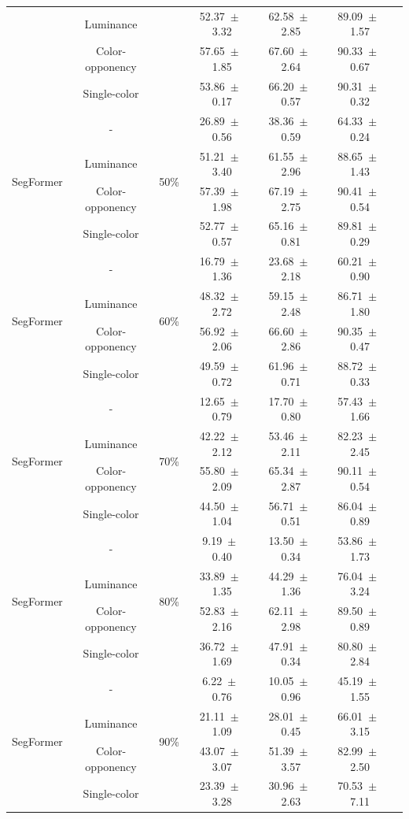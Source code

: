 \begin{table}[h]
\begin{tabular}{@{}lccc ccc@{}}
& Luminance & & 52.37~$\pm$~3.32 & 62.58~$\pm$~2.85 & 89.09~$\pm$~1.57 \\
& Color-opponency & & 57.65~$\pm$~1.85 & 67.60~$\pm$~2.64 & 90.33~$\pm$~0.67 \\
& Single-color & & 53.86~$\pm$~0.17 & 66.20~$\pm$~0.57 & 90.31~$\pm$~0.32 \\
\midrule
\multirow{4}{*}{SegFormer} & - & \multirow{4}{*}{50\%} & 26.89~$\pm$~0.56 & 38.36~$\pm$~0.59 & 64.33~$\pm$~0.24 \\
& Luminance & & 51.21~$\pm$~3.40 & 61.55~$\pm$~2.96 & 88.65~$\pm$~1.43 \\
& Color-opponency & & 57.39~$\pm$~1.98 & 67.19~$\pm$~2.75 & 90.41~$\pm$~0.54 \\
& Single-color & & 52.77~$\pm$~0.57 & 65.16~$\pm$~0.81 & 89.81~$\pm$~0.29 \\
\midrule
\multirow{4}{*}{SegFormer} & - & \multirow{4}{*}{60\%} & 16.79~$\pm$~1.36 & 23.68~$\pm$~2.18 & 60.21~$\pm$~0.90 \\
& Luminance & & 48.32~$\pm$~2.72 & 59.15~$\pm$~2.48 & 86.71~$\pm$~1.80 \\
& Color-opponency & & 56.92~$\pm$~2.06 & 66.60~$\pm$~2.86 & 90.35~$\pm$~0.47 \\
& Single-color & & 49.59~$\pm$~0.72 & 61.96~$\pm$~0.71 & 88.72~$\pm$~0.33 \\
\midrule
\multirow{4}{*}{SegFormer} & - & \multirow{4}{*}{70\%} & 12.65~$\pm$~0.79 & 17.70~$\pm$~0.80 & 57.43~$\pm$~1.66 \\
& Luminance & & 42.22~$\pm$~2.12 & 53.46~$\pm$~2.11 & 82.23~$\pm$~2.45 \\
& Color-opponency & & 55.80~$\pm$~2.09 & 65.34~$\pm$~2.87 & 90.11~$\pm$~0.54 \\
& Single-color & & 44.50~$\pm$~1.04 & 56.71~$\pm$~0.51 & 86.04~$\pm$~0.89 \\
\midrule
\multirow{4}{*}{SegFormer} & - & \multirow{4}{*}{80\%} & 9.19~$\pm$~0.40 & 13.50~$\pm$~0.34 & 53.86~$\pm$~1.73 \\
& Luminance & & 33.89~$\pm$~1.35 & 44.29~$\pm$~1.36 & 76.04~$\pm$~3.24 \\
& Color-opponency & & 52.83~$\pm$~2.16 & 62.11~$\pm$~2.98 & 89.50~$\pm$~0.89 \\
& Single-color & & 36.72~$\pm$~1.69 & 47.91~$\pm$~0.34 & 80.80~$\pm$~2.84 \\
\midrule
\multirow{4}{*}{SegFormer} & - & \multirow{4}{*}{90\%} & 6.22~$\pm$~0.76 & 10.05~$\pm$~0.96 & 45.19~$\pm$~1.55 \\
& Luminance & & 21.11~$\pm$~1.09 & 28.01~$\pm$~0.45 & 66.01~$\pm$~3.15 \\
& Color-opponency & & 43.07~$\pm$~3.07 & 51.39~$\pm$~3.57 & 82.99~$\pm$~2.50 \\
& Single-color & & 23.39~$\pm$~3.28 & 30.96~$\pm$~2.63 & 70.53~$\pm$~7.11 \\
\midrule
\bottomrule
\end{tabular}
\label{tab:sparse_results_segformer_acdc_fog}
\end{table}